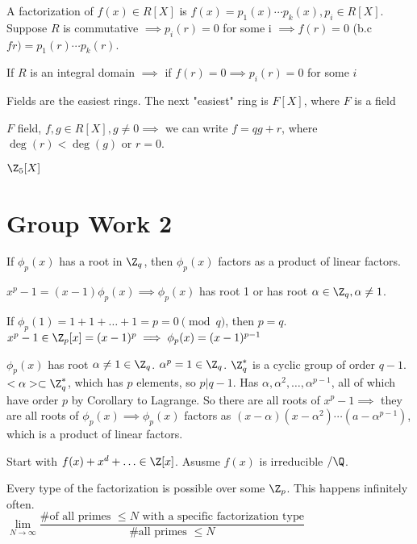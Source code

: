 \documentclass[twoside, 10pt]{article}
\begin{document}
\begin{defn}
    A factorization of $f(x) \in R[X]$ is $f(x) = p_1(x) \cdots p_k(x), p_i \in R[X]$. Suppose $R$ is commutative $\implies p_i(r) = 0$ for some i $\implies f(r) = 0$ (b.c $fr) = p_1(r) \cdots p_k(r)$.

    If $R$ is an integral domain $\implies$ if $f(r) = 0 \implies p_i(r) = 0$ for some $i$
\end{defn}

\begin{rmk}
    Fields are the easiest rings. The next "easiest" ring is $F[X]$, where $F$ is a field
\end{rmk}

\begin{defn}
    $F$ field, $f, g\in R[X], g\neq 0 \implies$ we can write $f = qg + r$, where $\deg(r) < \deg(g)$ or $r = 0$.
\end{defn}

$\Z_5[X]$ 

\section{Group Work 2}
\begin{rmk}
    If $\phi_p(x)$ has a root in $\Z_q$, then $\phi_p(x)$ factors as a product of linear factors.
\end{rmk}

$x^p-1 = (x-1) \phi_p(x) \implies \phi_p(x)$ has root 1 or has root $\alpha \in \Z_q, \alpha\neq 1$.

If $\phi_p(1) = 1 + 1 + \ldots + 1 = p = 0 \pmod{q}$, then $p = q$. $x^p - 1 \in \Z_p[x] = (x-1)^p \implies \phi_p(x) = (x-1)^{p-1}$

$\phi_p(x)$ has root $\alpha \neq 1 \in \Z_q$. $\alpha^p = 1 \in \Z_q$. $\Z_q^*$ is a cyclic group of order $q-1$. $<\alpha> \subset \Z_q^*$, which has $p$ elements, so $p | q-1$. Has $\alpha, \alpha^2, \ldots, \alpha^{p-1}$, all of which have order $p$ by Corollary to Lagrange. So there are all roots of $x^p - 1 \implies$ they are all roots of $\phi_p(x) \implies \phi_p(x)$ factors as $(x-\alpha)(x-\alpha^2)\cdots (a-\alpha^{p-1})$, which is a product of linear factors.

Start with $f(x) + x^d + \ldots \in \Z[x]$. Asusme $f(x)$ is irreducible $/\Q$. 
\begin{thm*}
    Every type of the factorization is possible  over some $\Z_p$. This happens infinitely often.\\
    $\lim\limits_{N\to \infty}\dfrac{\text{\# of all primes }\leq N \text{ with a specific factorization type}}{\text{\# all primes }\leq N}$
\end{thm*}
\end{document}
